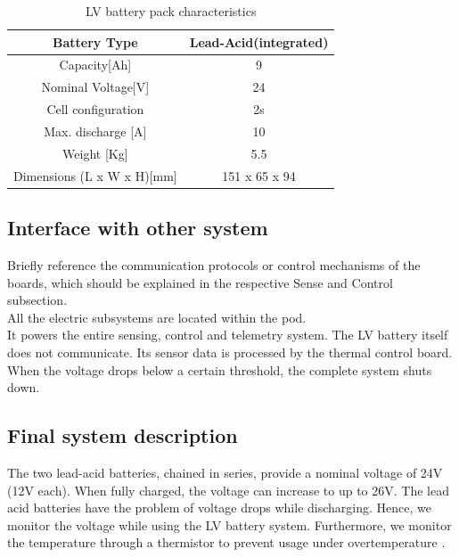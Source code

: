 \begin{table}[h]
    \centering
    \begin{adjustbox}{width=\textwidth,center}
    \begin{tabular}{|c|c|}
       \hline
       Battery Type & Lead-Acid(integrated)\\
       \hline
       Capacity[Ah] & 9 \\
       \hline
       Nominal Voltage[V] & 24 \\
       \hline
       Cell configuration & 2s \\
       \hline
       Max. discharge [A] & 10 \\
       \hline
       Weight [Kg] & 5.5 \\
       \hline 
       Dimensions (L x W x H)[mm] & 151 x 65 x 94 \\
       \hline 
    \end{tabular}
    \end{adjustbox}
    \label{Low Voltage Battery Specs}
    \caption{LV battery pack characteristics}
\end{table}    

\subsection{Interface with other system}
Briefly reference the communication protocols or control mechanisms of the boards, which should be explained in the respective Sense and Control subsection. \\
All the electric subsystems are located within the pod. \\
It powers the entire sensing, control and telemetry system. 
The LV battery itself does not communicate. Its sensor data is processed by the thermal control board.
When the voltage drops below a certain threshold, the complete system shuts down.

\subsection{Final system description}
The two lead-acid batteries, chained in series, provide a nominal voltage of 24V (12V each). When fully charged, the voltage can increase to up to 26V. The lead acid batteries have the problem of voltage drops while discharging. Hence, we monitor the voltage while using the LV battery system. Furthermore, we monitor the temperature through a thermistor to prevent usage under overtemperature . \\

